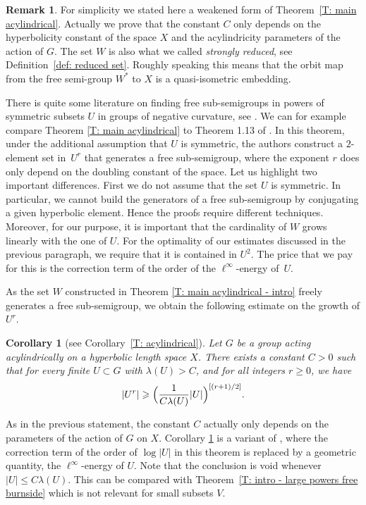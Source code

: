 \documentclass[11pt]{article}
\theoremstyle{plain}
\newtheorem{cor}[thm]{Corollary}
\theoremstyle{definition}
\newtheorem{rem}[thm]{Remark}
\begin{document}
\begin{rem}
For simplicity we stated here a weakened form of Theorem~\ref{T: main acylindrical}.
Actually we prove that the constant $C$ only depends on the hyperbolicity constant of the space $X$ and the acylindricity parameters of the action of $G$.
The set $W$ is also what we called \emph{strongly reduced}, see Definition~\ref{def: reduced set}.
Roughly speaking this means that the orbit map from the free semi-group $W^*$ to $X$ is a quasi-isometric embedding.
\end{rem}

There is quite some literature on finding free sub-semigroups in powers of symmetric subsets $U$ in groups of negative curvature, see \cite{koubi_croissance_1998,arzhantseva_lower_2006,breuillard_joint_2018}.
We can for example compare Theorem \ref{T: main acylindrical} to Theorem 1.13 of \cite{breuillard_joint_2018}. In this theorem, under the additional assumption that $U$ is symmetric, the authors construct a $2$-element set in~$U^r$ that generates a free sub-semigroup, where the exponent $r$ does only depend on the doubling constant of the space.
Let us highlight two important differences.
First we do not assume that the set $U$ is symmetric.
In particular, we cannot build the generators of a free sub-semigroup by conjugating a given hyperbolic element.
Hence the proofs require different techniques.
Moreover, for our purpose, it is important that the cardinality of $W$ grows linearly with the one of $U$. For the optimality of our estimates discussed in the previous paragraph, we require that it is contained in $U^2$.
The price that we pay for this is the correction term of the order of the $\ell^{\infty}$-energy of~$U$.

As the set $W$ constructed in Theorem \ref{T: main acylindrical - intro} freely generates a free sub-semigroup, we obtain the following estimate on the growth of $U^r$.

\begin{cor}[see Corollary~\ref{T: acylindrical}]
\label{T: acylindrical - intro}
Let $G$ be a group acting acylindrically on a hyperbolic length space $X$.
There exists a constant $C > 0$ such that for every finite $U\subset G$ with $\lambda(U)> C$, and for all integers $r\geqslant 0$, we have
\[
|U^r|\geqslant \Bigl(\frac 1{C\lambda(U)} |U| \Bigr)^{[(r+1)/2]} .
\]
\end{cor}

As in the previous statement, the constant $C$ actually only depends on the parameters of the action of $G$ on $X$.
Corollary \ref{T: acylindrical - intro} is a variant of \cite[Th.\,1.14]{delzant_product_2020}, where the correction term of the order of $\log|U|$ in this theorem is replaced by a geometric quantity, the $\ell^{\infty}$-energy of $U$.
Note that the conclusion is void whenever $|U| \leq C \lambda(U)$.
This can be compared with Theorem~\ref{T: intro - large powers free burnside} which is not relevant for small subsets $V$.
\end{document}
